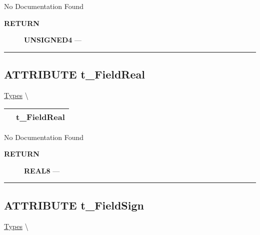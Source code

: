 No Documentation Found








\par
\begin{description}
\item [\colorbox{tagtype}{\color{white} \textbf{\textsf{RETURN}}}] \textbf{UNSIGNED4} --- 
\end{description}




\rule{\linewidth}{0.5pt}
\subsection*{\textsf{\colorbox{headtoc}{\color{white} ATTRIBUTE}
t\_FieldReal}}

\hypertarget{ecldoc:ml_core.types.t_fieldreal}{}
\hspace{0pt} \hyperlink{ecldoc:ML_Core.Types}{Types} \textbackslash 

{\renewcommand{\arraystretch}{1.5}
\begin{tabularx}{\textwidth}{|>{\raggedright\arraybackslash}l|X|}
\hline
\hspace{0pt}\mytexttt{\color{red} } & \textbf{t\_FieldReal} \\
\hline
\end{tabularx}
}

\par





No Documentation Found








\par
\begin{description}
\item [\colorbox{tagtype}{\color{white} \textbf{\textsf{RETURN}}}] \textbf{REAL8} --- 
\end{description}




\rule{\linewidth}{0.5pt}
\subsection*{\textsf{\colorbox{headtoc}{\color{white} ATTRIBUTE}
t\_FieldSign}}

\hypertarget{ecldoc:ml_core.types.t_fieldsign}{}
\hspace{0pt} \hyperlink{ecldoc:ML_Core.Types}{Types} \textbackslash 

